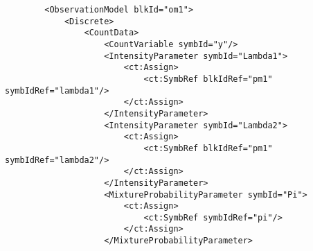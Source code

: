 \lstset{language=XML}
\begin{lstlisting}
        <ObservationModel blkId="om1">
            <Discrete>
                <CountData>
                    <CountVariable symbId="y"/>
                    <IntensityParameter symbId="Lambda1">
                        <ct:Assign>
                            <ct:SymbRef blkIdRef="pm1" symbIdRef="lambda1"/>
                        </ct:Assign>
                    </IntensityParameter>
                    <IntensityParameter symbId="Lambda2">
                        <ct:Assign>
                            <ct:SymbRef blkIdRef="pm1" symbIdRef="lambda2"/>
                        </ct:Assign>
                    </IntensityParameter>
                    <MixtureProbabilityParameter symbId="Pi">
                        <ct:Assign>
                            <ct:SymbRef symbIdRef="pi"/>
                        </ct:Assign>
                    </MixtureProbabilityParameter>
                    

\end{lstlisting}
